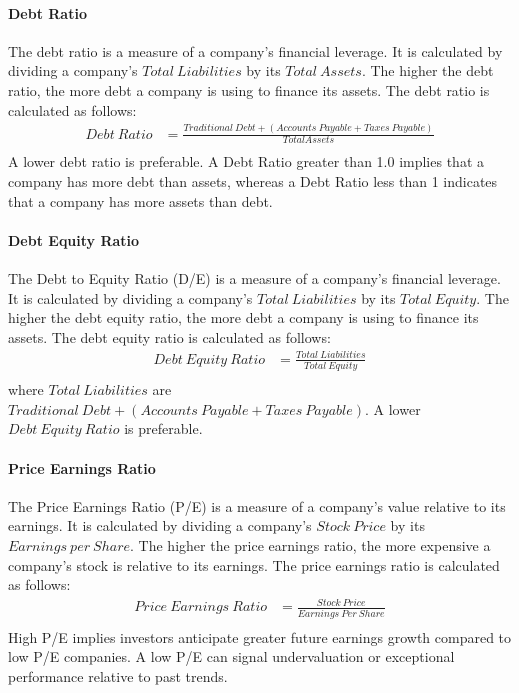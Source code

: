 \documentclass[../xlapes02]{subfiles}
\begin{document}
    \paragraph{Debt Ratio}\label{par:debt-ratio}
    The debt ratio is a measure of a company's financial leverage. It is calculated by dividing a company's $Total\ Liabilities$ by its $Total\ Assets$. The higher the debt ratio, the more debt a company is using to finance its assets. The debt ratio is calculated as follows:
    \begin{equation}
        \begin{split}
            Debt\ Ratio&=\frac{Traditional\ Debt+(Accounts\ Payable+Taxes\ Payable)}{Total Assets}\\
        \end{split}
    \end{equation}
    A lower debt ratio is preferable. A Debt Ratio greater than 1.0 implies that a company has more debt than assets, whereas a Debt Ratio less than 1 indicates that a company has more assets than debt.

    \paragraph{Debt Equity Ratio}\label{par:debt-equity-ratio}
    The Debt to Equity Ratio (D/E) is a measure of a company's financial leverage. It is calculated by dividing a company's $Total\ Liabilities$ by its $Total\ Equity$. The higher the debt equity ratio, the more debt a company is using to finance its assets. The debt equity ratio is calculated as follows:
    \begin{equation}
        \begin{split}
            Debt\ Equity\ Ratio&=\frac{Total\ Liabilities}{Total\ Equity}\\
        \end{split}
    \end{equation}
    where $Total\ Liabilities$ are $Traditional\ Debt+(Accounts\ Payable+Taxes\ Payable)$. A lower $Debt\ Equity\ Ratio$ is preferable.

    \paragraph{Price Earnings Ratio}\label{par:price-earnings-ratio}
    The Price Earnings Ratio (P/E) is a measure of a company's value relative to its earnings. It is calculated by dividing a company's $Stock\ Price$ by its $Earnings\ per\ Share$. The higher the price earnings ratio, the more expensive a company's stock is relative to its earnings. The price earnings ratio is calculated as follows:
    \begin{equation}
        \begin{split}
            Price\ Earnings\ Ratio&=\frac{Stock\ Price}{Earnings\ Per\ Share}\\
        \end{split}
    \end{equation}
    High P/E implies investors anticipate greater future earnings growth compared to low P/E companies. A low P/E can signal undervaluation or exceptional performance relative to past trends.
\end{document}
